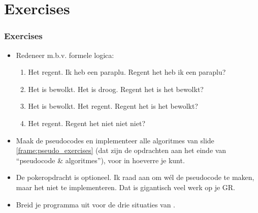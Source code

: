 \section{Exercises}

\begin{frame}
\frametitle{Exercises}

\begin{itemize}
  \item Redeneer m.b.v. formele logica:
	\begin{enumerate}
      \item Het regent. Ik heb een paraplu. Regent het  heb ik een paraplu?
      \item Het is bewolkt. Het is droog. Regent het  is het bewolkt?
      \item Het is bewolkt. Het regent. Regent het  is het bewolkt?
      \item Het regent. Regent het niet niet niet?
	\end{enumerate}
  \item Maak de pseudocodes en implementeer alle algoritmes van slide \ref{frame:pseudo_exercises}
	(dat zijn de opdrachten aan het einde van ``pseudocode \& algoritmes''), voor in hoeverre je kunt.
  \item De pokeropdracht is optioneel. Ik raad aan om w\'el de pseudocode te maken, maar het niet te implementeren.
	Dat is gigantisch veel werk op je GR.
  \item Breid je  programma uit voor de drie situaties van .
\end{itemize}

\end{frame}

